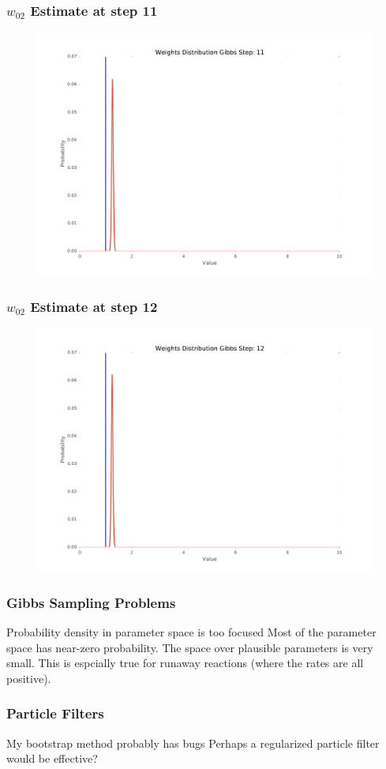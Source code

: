 \documentclass{beamer}
\begin{document}
\begin{frame}
\frametitle{$w_{02}$ Estimate at step 11}
\begin{figure}
\includegraphics[width=0.8\linewidth]{figs/11_WeDistr}
\end{figure}
\end{frame}

\begin{frame}
\frametitle{$w_{02}$ Estimate at step 12}
\begin{figure}
\includegraphics[width=0.8\linewidth]{figs/12_WeDistr}
\end{figure}
\end{frame}

\begin{frame}
\frametitle{Gibbs Sampling Problems}
\begin{block}{Probability density in parameter space is too focused}
{Most of the parameter space has near-zero probability. The space over plausible parameters is very small. This is espcially true for runaway reactions (where the rates are all positive).}
\end{block}
\end{frame}

\begin{frame}
\frametitle{Particle Filters}
\begin{block}{My bootstrap method probably has bugs}
{Perhaps a regularized particle filter would be effective?}
\end{block}
\end{frame}
\end{document}
